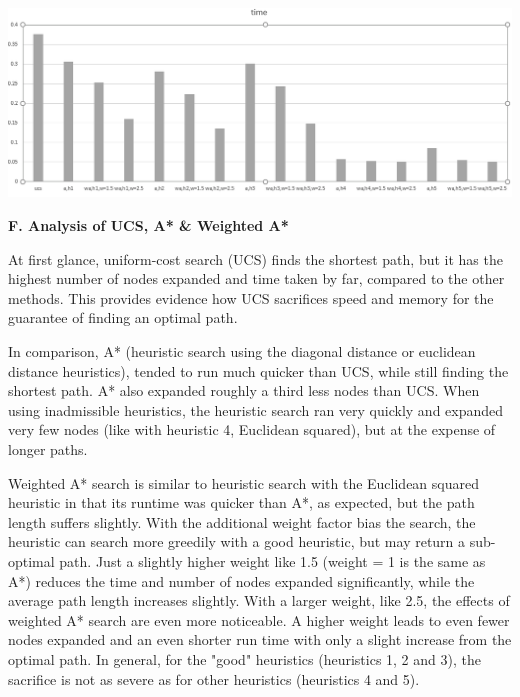 \documentclass[12pt, letterpaper]{article}
\begin{document}
\medskip

\noindent \includegraphics[scale=0.65]{"avg-runtime"}

\medskip

\pagebreak %

\noindent \textbf{F. Analysis of UCS, A* \& Weighted A*}

At first glance, uniform-cost search (UCS) finds the shortest path, but it has the highest number of nodes expanded and time taken by far, compared to the other methods. This provides evidence how UCS sacrifices speed and memory for the guarantee of finding an optimal path.

In comparison, A* (heuristic search using the diagonal distance or euclidean distance heuristics),  tended to run much quicker than UCS, while still finding the shortest path. A* also expanded roughly a third less nodes than UCS. When using inadmissible heuristics, the heuristic search ran very quickly and expanded very few nodes (like with heuristic 4, Euclidean squared), but at the expense of longer paths.

Weighted A* search is similar to heuristic search with the Euclidean squared heuristic in that its runtime was quicker than A*, as expected, but the path length suffers slightly. With the additional weight factor bias the search, the heuristic can search more greedily with a good heuristic, but may return a sub-optimal path. Just a slightly higher weight like 1.5 (weight = 1 is the same as A*) reduces the time and number of nodes expanded significantly, while the average path length increases slightly. With a larger weight, like 2.5, the effects of weighted A* search are even more noticeable. A higher weight leads to even fewer nodes expanded and an even shorter run time with only a slight increase from the optimal path. In general, for the "good" heuristics (heuristics 1, 2 and 3), the sacrifice is not as severe as for other heuristics (heuristics 4 and 5). \newline
\end{document}

